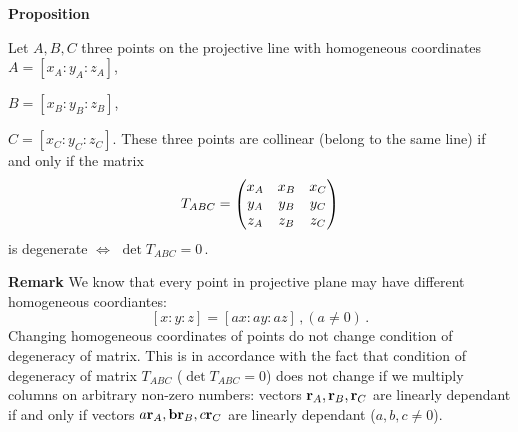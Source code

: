 \documentclass[12pt]{article}
\numberwithin{equation}{section}
\begin{document}
{\bf Proposition}\label{collinearity1}

{Let $A,B,C$ three points on the projective line
with homogeneous coordinates
  $A=[x_A:y_A:z_A]$,

  $B=[x_B:y_B:z_B]$,

  $C=[x_C:y_C:z_C]$.
These three points are collinear (belong to the same line)
if and only if the matrix
         \begin{equation}\label{collinearityeq1}
        T_{ABC}=\begin{pmatrix}
             x_A & x_B & x_C\cr 
             y_A & y_B & y_C\cr 
             z_A & z_B & z_C\cr 
           \end{pmatrix}
         \end{equation}
is degenerate $\Leftrightarrow$ $\det  T_{ABC}=0$\,.
}

{\bf Remark} We know that every  point in projective plane
may have different
homogeneous coordiantes:
        $$
[x:y:z]=[a x:ay:az]\,, (a\not=0)\,.
        $$
Changing homogeneous coordinates
of points do not change condition of degeneracy of matrix.
This is in accordance with the fact that   
condition of degeneracy of matrix $T_{ABC}$
($\det T_{ABC}=0$)
does not change if we multiply 
columns on arbitrary non-zero numbers:
vectors ${\bf r}_A,{\bf r}_B, {\bf r}_C$
are linearly dependant if and only if
vectors $a{\bf r}_A,{\bf b}{\bf r}_B,c{\bf r}_C$ are linearly dependant
  ($a,b,c\not=0$).  
   
\end{document}
